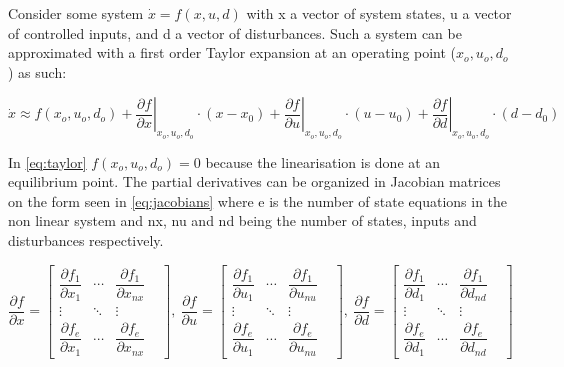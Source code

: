 Consider some system $\dot{x} = f(x,u,d)$ with x a vector of system states, u a vector of controlled inputs, and d a vector of disturbances. Such a system can be approximated with a first order Taylor expansion at an operating point ($x_o, u_o, d_o$) as such:

\begin{equation} \label{eq:taylor}
	\dot{x}   \approx   f(x_o, u_o, d_o)   +
	\left. \dfrac{\partial f}{\partial x} \right |_{x_o, u_o, d_o} \cdot (x-x_0) +
	\left. \dfrac{\partial f}{\partial u} \right |_{x_o, u_o, d_o} \cdot (u-u_0) +
	\left. \dfrac{\partial f}{\partial d} \right |_{x_o, u_o, d_o} \cdot (d-d_0)
\end{equation}

In \cref{eq:taylor} $f(x_o, u_o, d_o) = 0$ because the linearisation is done at an equilibrium point. The partial derivatives can be organized in Jacobian matrices on the form seen in \cref{eq:jacobians} where e is the number of state equations in the non linear system and nx, nu and nd being the number of states, inputs and disturbances respectively.

\begin{equation} \label{eq:jacobians}
	\dfrac{\partial f}{\partial x} =
		\begin{bmatrix}
			\dfrac{\partial f_1}{\partial x_1} & \cdots & \dfrac{\partial f_1}{\partial x_{nx}} & \\
			\vdots & \ddots & \vdots & \\
			\dfrac{\partial f_e}{\partial x_1} & \cdots & \dfrac{\partial f_e}{\partial x_{nx}} &
		\end{bmatrix}, \
	\dfrac{\partial f}{\partial u} =
		\begin{bmatrix}
			\dfrac{\partial f_1}{\partial u_1} & \cdots & \dfrac{\partial f_1}{\partial u_{nu}} & \\
			\vdots & \ddots & \vdots & \\
			\dfrac{\partial f_e}{\partial u_1} & \cdots & \dfrac{\partial f_e}{\partial u_{nu}} &
		\end{bmatrix}, \
	\dfrac{\partial f}{\partial d} =
		\begin{bmatrix}
			\dfrac{\partial f_1}{\partial d_1} & \cdots & \dfrac{\partial f_1}{\partial d_{nd}} & \\
			\vdots & \ddots & \vdots & \\
			\dfrac{\partial f_e}{\partial d_1} & \cdots & \dfrac{\partial f_e}{\partial d_{nd}} &
		\end{bmatrix}
\end{equation}


